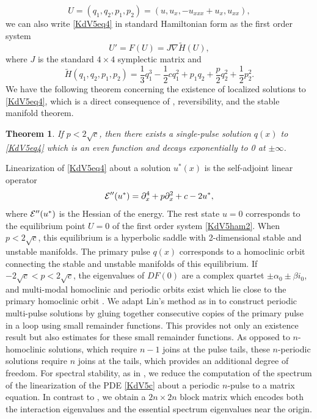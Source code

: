 \documentclass[12pt]{elsarticle}
\theoremstyle{plain}
\newtheorem{theorem}{Theorem}
\theoremstyle{definition}
\theoremstyle{remark}
\numberwithin{theorem}{section}
\numberwithin{equation}{section}
\begin{document}
\begin{equation}\label{KdV5U}
U = (q_1, q_2, p_1, p_2) = (u, u_x, -u_{xxx} + u_x, u_{xx}),
\end{equation}
we can also write \cref{KdV5eq4} in standard Hamiltonian form as the first order system
\begin{equation}\label{KdV5ham2}
U' = F(U) = J \nabla \tilde{H}(U),
\end{equation}
where $J$ is the standard $4 \times 4$ symplectic matrix and
\begin{equation}
\tilde{H}(q_1, q_2, p_1, p_2) = \frac{1}{3}q_1^3 - \frac{1}{2}c q_1^2 + p_1 q_2 + \frac{p}{2}q_2^2 + \frac{1}{2}p_2^2.
\end{equation}
We have the following theorem concerning the existence of localized solutions to \cref{KdV5eq4}, which is a direct consequence of \cite{Groves1998}, reversibility, and the stable manifold theorem.

\begin{theorem}\label{KdV1pulse}
If $p < 2 \sqrt{c}$, then there exists a single-pulse solution $q(x)$ to \cref{KdV5eq4} which is an even function and decays exponentially to 0 at $\pm \infty$.
\end{theorem}

Linearization of \cref{KdV5eq4} about a solution $u^*(x)$ is the self-adjoint linear operator
\begin{equation}\label{KdV5hessian}
\mathcal{E}''(u^*) = \partial_x^4 + p \partial_x^2 + c - 2 u^*,
\end{equation}
where $\mathcal{E}''(u^*)$ is the Hessian of the energy. The rest state $u = 0$ corresponds to the equilibrium point $U = 0$ of the first order system \cref{KdV5ham2}. When $p < 2 \sqrt{c}$, this equilibrium is a hyperbolic saddle with 2-dimensional stable and unstable manifolds. The primary pulse $q(x)$ corresponds to a homoclinic orbit connecting the stable and unstable manifolds of this equilibrium. If $-2 \sqrt{c} < p < 2 \sqrt{c}$, the eigenvalues of $DF(0)$ are a complex quartet $\pm \alpha_0 \pm \beta i_0$, and multi-modal homoclinic and periodic orbits exist which lie close to the primary homoclinic orbit \cite{SandstedeStrut}. We adapt Lin's method as in \cite{Sandstede1993, SandstedeStrut} to construct periodic multi-pulse solutions by gluing together consecutive copies of the primary pulse in a loop using small remainder functions. This provides not only an existence result but also estimates for these small remainder functions. As opposed to $n$-homoclinic solutions, which require $n-1$ joins at the pulse tails, these $n$-periodic solutions require $n$ joins at the tails, which provides an additional degree of freedom. For spectral stability, as in \cite{Sandstede1998}, we reduce the computation of the spectrum of the linearization of the PDE \cref{KdV5c} about a periodic $n$-pulse to a matrix equation. In contrast to \cite{Sandstede1998}, we obtain a $2n \times 2n$ block matrix which encodes both the interaction eigenvalues and the essential spectrum eigenvalues near the origin.
\end{document}
